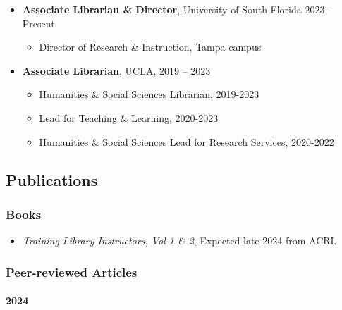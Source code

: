 \documentclass[
  letterpaper,
  DIV=11,
  numbers=noendperiod]{scrartcl}
\let\oldparagraph\paragraph
\renewcommand{\paragraph}[1]{\oldparagraph{#1}\mbox{}}
\providecommand{\tightlist}{%
  \setlength{\itemsep}{0pt}\setlength{\parskip}{0pt}}\usepackage{longtable,booktabs,array}
\begin{document}
\begin{itemize}
\tightlist
\item
  \textbf{Associate Librarian \& Director}, University of South Florida
  {2023 -- Present}

  \begin{itemize}
  \tightlist
  \item
    Director of Research \& Instruction, Tampa campus
  \end{itemize}
\item
  \textbf{Associate Librarian}, UCLA, {2019 -- 2023}

  \begin{itemize}
  \tightlist
  \item
    Humanities \& Social Sciences Librarian, 2019-2023
  \item
    Lead for Teaching \& Learning, 2020-2023
  \item
    Humanities \& Social Sciences Lead for Research Services, 2020-2022
  \end{itemize}
\end{itemize}

\subsection{\texorpdfstring{
Publications}{ Publications}}\label{publications}

\subsubsection{\texorpdfstring{ Books}{ Books}}\label{books}

\begin{itemize}
\tightlist
\item
  \emph{Training Library Instructors, Vol 1 \& 2}, Expected late 2024
  from ACRL
\end{itemize}

\subsubsection{\texorpdfstring{ Peer-reviewed
Articles}{ Peer-reviewed Articles}}\label{peer-reviewed-articles}

\paragraph{2024}\label{section}

\label{published-papers-2024}
\end{document}
